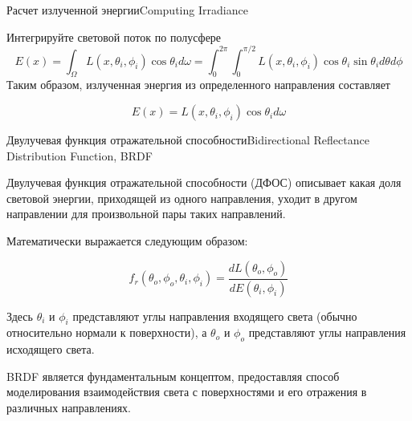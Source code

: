 \documentclass{beamer}
\begin{document}
	\begin{frame}{Расчет излученной энергии}{Computing Irradiance}
		
	Интегрируйте световой поток по полусфере
		\[
			E(x) = \int_{\Omega} L(x, \theta_i, \phi_i) \cos \theta_i d \omega
			=
			\int_{0}^{2\pi}\int_{0}^{\pi / 2} 
			L(x, \theta_i, \phi_i) 
			\cos \theta_i \sin \theta_i d \theta d \phi
		\]
	Таким образом, излученная энергия из определенного направления составляет

	\[
		E(x) = L(x, \theta_i, \phi_i) \cos \theta_i d \omega
	\]

	\end{frame}

	\begin{frame}{Двулучевая функция отражательной способности}{Bidirectional Reflectance Distribution Function, BRDF}
		
		Двулучевая функция отражательной способности (ДФОС) описывает какая доля световой энергии, приходящей из одного направления, уходит в другом направлении для произвольной пары таких направлений. 
		
		Математически выражается следующим образом:

		\[
			f_r
			(\theta_o, \phi_o, \theta_i, \phi_i) =
			\frac{d L(\theta_o, \phi_o)}{d E (\theta_i, \phi_i)}
		\]


		Здесь \(\theta_i\) и \(\phi_i\) представляют углы направления входящего света (обычно относительно нормали к поверхности), а \(\theta_o\) и \(\phi_o\) представляют углы направления исходящего света. 

		BRDF является фундаментальным концептом,
		предоставляя способ моделирования взаимодействия света с поверхностями и его отражения в различных направлениях.

	\end{frame}
\end{document}
